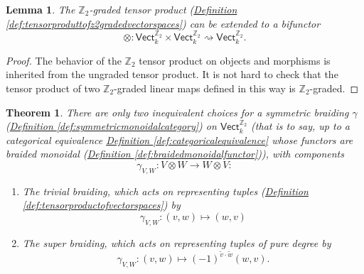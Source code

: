 \documentclass[a4paper,10pt]{scrreprt}
\newcommand{\Z}{\mathbb{Z}}
\theoremstyle{definition}
\theoremstyle{plain}
\newtheorem{theorem}{Theorem}[section]
\newtheorem{lemma}{Lemma}[section]
\theoremstyle{remark}
\begin{document}
\begin{lemma}
  The $\Z_{2}$-graded tensor product (\hyperref[def:tensorproduttofz2gradedvectorspaces]{Definition \ref*{def:tensorproduttofz2gradedvectorspaces}}) can be extended to a bifunctor 
  \begin{equation*}
    \otimes\colon \mathsf{Vect}_k^{\Z_{2}} \times \mathsf{Vect}_k^{\Z_{2}} \rightsquigarrow \mathsf{Vect}_k^{\Z_{2}}.
  \end{equation*}
\end{lemma}
\begin{proof}
  The behavior of the $\Z_{2}$ tensor product on objects and morphisms is inherited from the ungraded tensor product. It is not hard to check that the tensor product of two $\Z_{2}$-graded linear maps defined in this way is $\Z_{2}$-graded.
\end{proof}

\begin{theorem}
  There are only two inequivalent choices for a symmetric braiding $\gamma$ (\hyperref[def:symmetricmonoidalcategory]{Definition \ref*{def:symmetricmonoidalcategory}}) on $\mathsf{Vect}_{k}^{\Z_{2}}$ (that is to say, up to a categorical equivalence \hyperref[def:categoricalequivalence]{Definition \ref*{def:categoricalequivalence}} whose functors are braided monoidal (\hyperref[def:braidedmonoidalfunctor]{Definition \ref*{def:braidedmonoidalfunctor}})),  with components
  \begin{equation*}
    \gamma_{V,W}\colon V \otimes W \to W \otimes V:
  \end{equation*}

  \begin{enumerate}
    \item The \emph{trivial braiding}, which acts on representing tuples (\hyperref[def:tensorproductofvectorspaces]{Definition \ref*{def:tensorproductofvectorspaces}}) by 
      \begin{equation*}
        \gamma_{V, W}\colon (v, w) \mapsto (w, v)
      \end{equation*}

    \item The \emph{super braiding}, which acts on representing tuples of pure degree by
      \begin{equation*}
        \gamma_{V, W}\colon (v, w) \mapsto (-1)^{\tilde{v}\cdot \tilde{w}}(w, v).
      \end{equation*}
  \end{enumerate}
\end{theorem}
\end{document}
